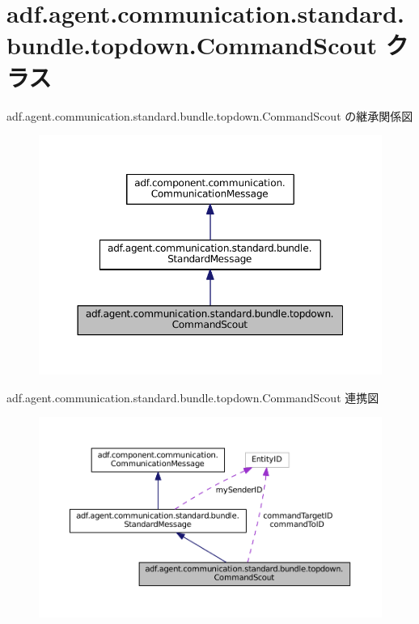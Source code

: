 \hypertarget{classadf_1_1agent_1_1communication_1_1standard_1_1bundle_1_1topdown_1_1CommandScout}{}\section{adf.\+agent.\+communication.\+standard.\+bundle.\+topdown.\+Command\+Scout クラス}
\label{classadf_1_1agent_1_1communication_1_1standard_1_1bundle_1_1topdown_1_1CommandScout}


adf.\+agent.\+communication.\+standard.\+bundle.\+topdown.\+Command\+Scout の継承関係図
\nopagebreak
\begin{figure}[H]
\begin{center}
\leavevmode
\includegraphics[width=350pt]{classadf_1_1agent_1_1communication_1_1standard_1_1bundle_1_1topdown_1_1CommandScout__inherit__graph}
\end{center}
\end{figure}


adf.\+agent.\+communication.\+standard.\+bundle.\+topdown.\+Command\+Scout 連携図
\nopagebreak
\begin{figure}[H]
\begin{center}
\leavevmode
\includegraphics[width=350pt]{classadf_1_1agent_1_1communication_1_1standard_1_1bundle_1_1topdown_1_1CommandScout__coll__graph}
\end{center}
\end{figure}
